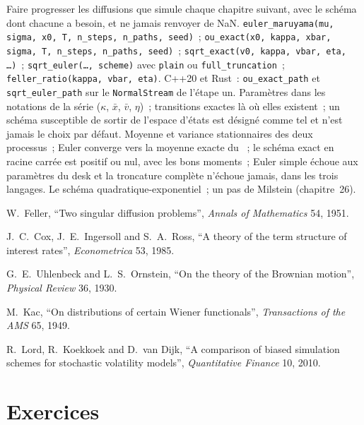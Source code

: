 \begin{build}
 Faire progresser les diffusions que simule chaque chapitre suivant, avec le schéma dont chacune
a besoin, et ne jamais renvoyer de NaN.
 \texttt{euler\_maruyama(mu, sigma, x0, T, n\_steps, n\_paths, seed)}~;
\texttt{ou\_exact(x0, kappa, xbar, sigma, T, n\_steps, n\_paths, seed)}~; \texttt{sqrt\_exact(v0,
kappa, vbar, eta, \dots)}~; \texttt{sqrt\_euler(\dots, scheme)} avec \texttt{plain} ou
\texttt{full\_truncation}~; \texttt{feller\_ratio(kappa, vbar, eta)}. C++20 et Rust~:
\texttt{ou\_exact\_path} et \texttt{sqrt\_euler\_path} sur le \texttt{NormalStream} de l'étape un.
 Paramètres dans les notations de la série ($\kappa$, $\bar x$, $\bar v$, $\eta$)~; transitions exactes là où
elles existent~; un schéma susceptible de sortir de l'espace d'états est désigné comme tel et n'est jamais le choix par défaut.
 Moyenne et variance stationnaires des deux processus~; Euler converge vers la
moyenne exacte du ~; le schéma exact en racine carrée est positif ou nul, avec
les bons moments~; Euler simple échoue aux paramètres du desk et la troncature complète n'échoue jamais, dans les trois
langages.
 Le schéma quadratique-exponentiel~; un pas de Milstein (chapitre~26).
\end{build}

\begin{omsources}
\item W.~Feller, ``Two singular diffusion problems'', \emph{Annals of Mathematics} 54, 1951.
\item J.~C.~Cox, J.~E.~Ingersoll and S.~A.~Ross, ``A theory of the term structure of interest
rates'', \emph{Econometrica} 53, 1985.
\item G.~E.~Uhlenbeck and L.~S.~Ornstein, ``On the theory of the Brownian motion'',
\emph{Physical Review} 36, 1930.
\item M.~Kac, ``On distributions of certain Wiener functionals'', \emph{Transactions of the AMS}
65, 1949.
\item R.~Lord, R.~Koekkoek and D.~van Dijk, ``A comparison of biased simulation schemes for
stochastic volatility models'', \emph{Quantitative Finance} 10, 2010.
\end{omsources}

\section{Exercices}

